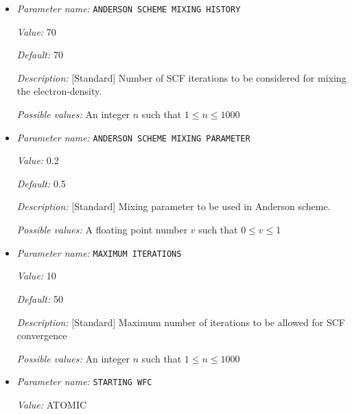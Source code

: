 \begin{itemize}
\item {\it Parameter name:} {\tt ANDERSON SCHEME MIXING HISTORY}
\label{parameters:SCF parameters/ANDERSON SCHEME MIXING HISTORY}
\label{parameters:SCF_20parameters/ANDERSON_20SCHEME_20MIXING_20HISTORY}


{\it Value:} 70


{\it Default:} 70


{\it Description:} [Standard] Number of SCF iterations to be considered for mixing the electron-density.


{\it Possible values:} An integer $n$ such that $1\leq n \leq 1000$
\item {\it Parameter name:} {\tt ANDERSON SCHEME MIXING PARAMETER}
\label{parameters:SCF parameters/ANDERSON SCHEME MIXING PARAMETER}
\label{parameters:SCF_20parameters/ANDERSON_20SCHEME_20MIXING_20PARAMETER}


{\it Value:} 0.2


{\it Default:} 0.5


{\it Description:} [Standard] Mixing parameter to be used in Anderson scheme.


{\it Possible values:} A floating point number $v$ such that $0 \leq v \leq 1$
\item {\it Parameter name:} {\tt MAXIMUM ITERATIONS}
\label{parameters:SCF parameters/MAXIMUM ITERATIONS}
\label{parameters:SCF_20parameters/MAXIMUM_20ITERATIONS}


{\it Value:} 10


{\it Default:} 50


{\it Description:} [Standard] Maximum number of iterations to be allowed for SCF convergence


{\it Possible values:} An integer $n$ such that $1\leq n \leq 1000$
\item {\it Parameter name:} {\tt STARTING WFC}
\label{parameters:SCF parameters/STARTING WFC}
\label{parameters:SCF_20parameters/STARTING_20WFC}


{\it Value:} ATOMIC



\end{itemize}
